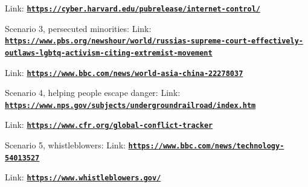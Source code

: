 \documentclass[12pt]{article}
\begin{document}
Link: \href{https://cyber.harvard.edu/pubrelease/internet-control/}{\textbf{\nolinkurl{https://cyber.harvard.edu/pubrelease/internet-control/}}}

Scenario 3, persecuted minorities:
Link: \href{https://www.pbs.org/newshour/world/russias-supreme-court-effectively-outlaws-lgbtq-activism-citing-extremist-movement}{\textbf{\nolinkurl{https://www.pbs.org/newshour/world/russias-supreme-court-effectively-outlaws-lgbtq-activism-citing-extremist-movement}}}

Link: \href{https://www.bbc.com/news/world-asia-china-22278037}{\textbf{\nolinkurl{https://www.bbc.com/news/world-asia-china-22278037}}}

Scenario 4, helping people escape danger:
Link: \href{https://www.nps.gov/subjects/undergroundrailroad/index.htm}{\textbf{\nolinkurl{https://www.nps.gov/subjects/undergroundrailroad/index.htm}}}

Link: \href{https://www.cfr.org/global-conflict-tracker}{\textbf{\nolinkurl{https://www.cfr.org/global-conflict-tracker}}}

Scenario 5, whistleblowers:
Link: \href{https://www.bbc.com/news/technology-54013527}{\textbf{\nolinkurl{https://www.bbc.com/news/technology-54013527}}}

Link: \href{https://www.whistleblowers.gov/}{\textbf{\nolinkurl{https://www.whistleblowers.gov/}}}
\end{document}
